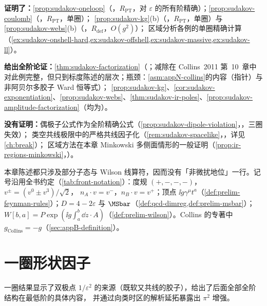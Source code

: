 \begin{tcolorbox}[enhanced,breakable,title=本章证明了什么／没有证明什么,fonttitle=\bfseries,
  colback=gray!3!white,colframe=gray!55!black,boxrule=0.6pt,arc=2pt,
  left=5pt,right=5pt,top=3pt,bottom=3pt,before skip=6pt,after skip=6pt]
\textbf{证明了：}\cref{prop:sudakov-oneloop}（\tagR，$R_{\mathrm{PT}}$，对 $\varepsilon$ 的所有阶精确）；\cref{prop:sudakov-coulomb}（\tagR，$R_{\mathrm{PT}}$，单圈）；
\cref{prop:sudakov-kg}(b)（\tagR，$R_{\mathrm{PT}}$，单圈）与\cref{prop:sudakov-webs}(b)（\tagR，$R_{\mathrm{def}}$，$O(g^2)$）；
区域分析各例的单圈精确计算（\cref{ex:sudakov-onshell-hard,ex:sudakov-offshell,ex:sudakov-massive,ex:sudakov-ll}）。\par
\textbf{给出全阶论证：}\cref{thm:sudakov-factorization}（\tagA；减除在 Collins~2011 第~10~章中对此例完整，但只到标度陈述的层次；瓶颈：\cref{asm:appN-collins}的内容（指针）与非阿贝尔多胶子 Ward 恒等式）；
\cref{prop:sudakov-kg}、\cref{cor:sudakov-exponentiation}、\cref{prop:sudakov-webs}、\cref{thm:sudakov-ir-poles}、\cref{prop:sudakov-amplitude-factorization}（均为\tagA）。\par
\textbf{没有证明：}偶极子公式作为全阶精确公式（\cref{prop:sudakov-dipole-violation}，\tagV，三圈失效）；
类空共线极限中的严格共线因子化（\cref{rem:sudakov-spacelike}，\tagV，详见\cref{ch:break}）；
区域方法在本章 Minkowski 多侧面情形的一般证明（\cref{prop:ir-regions-minkowski}，\tagP）。
\end{tcolorbox}

本章陈述都只涉及部分子态与 Wilson 线算符，因而没有「非微扰地位」一行。记号沿用全书约定（\cref{tab:front-notation}）：度规 $(+,-,-,-)$，$v^\pm=(v^0\pm v^3)/\sqrt2$，
$n_A\cdot v=v^-$，$n_B\cdot v=v^+$；顶点 $\ii g\gamma^\mu t^a$（\cref{def:prelim-feynman-rules}）；$D=4-2\varepsilon$ 与 $\MSbar$（\cref{def:qcd-dimreg,def:prelim-msbar}）；
$W[b,a]=P\exp(\ii g\int_a^b\dd z\cdot A)$（\cref{def:prelim-wilson}）。Collins 的专著\cite{Collins2011}中 $g_{\mathrm{Collins}}=-g$（\cref{sec:appB-definition}）。
\section{一圈形状因子}\label{sec:sudakov-oneloop}

一圈结果显示了双极点 $1/\varepsilon^2$ 的来源（既软又共线的胶子），给出了后面全部全阶结构在最低阶的具体内容，
并通过向类时区的解析延拓暴露出 $\pi^2$ 增强。

